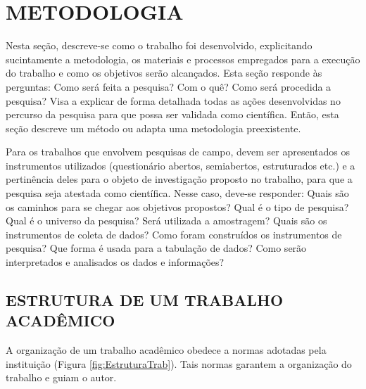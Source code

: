 \chapter{METODOLOGIA}\label{chp:METODOLOGIA}

Nesta seção, descreve-se como o trabalho foi desenvolvido, explicitando sucintamente a metodologia, os materiais e processos empregados para a execução do trabalho e como os objetivos serão alcançados. Esta seção responde às perguntas: Como será feita a pesquisa? Com o quê? Como será procedida a pesquisa? Visa a explicar de forma detalhada todas as ações desenvolvidas no percurso da pesquisa para que possa ser validada como científica. Então, esta seção descreve um método ou adapta uma metodologia preexistente. 

Para os trabalhos que envolvem pesquisas de campo, devem ser apresentados os instrumentos utilizados (questionário abertos, semiabertos, estruturados etc.) e a pertinência deles para o objeto de investigação proposto no trabalho, para que a pesquisa seja atestada como científica. Nesse caso, deve-se responder: Quais são os caminhos para se chegar aos objetivos propostos? Qual é o tipo de pesquisa? Qual é o universo da pesquisa? Será utilizada a amostragem? Quais são os instrumentos de coleta de dados?  Como foram construídos os instrumentos de pesquisa? Que forma é usada para a tabulação de dados? Como serão interpretados e analisados os dados e informações? 

 \section{ESTRUTURA DE UM TRABALHO ACADÊMICO}\label{sec:ESTRUTURATRAB}
A organização de um trabalho acadêmico obedece a normas adotadas pela instituição (Figura \ref{fig:EstruturaTrab}). Tais normas garantem a organização do trabalho e guiam o autor.

